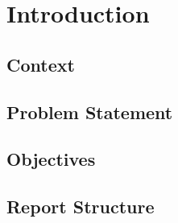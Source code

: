\section{Introduction}
\label{sec:introduction}

\subsection{Context}

\subsection{Problem Statement}

\subsection{Objectives}

\subsection{Report Structure}
